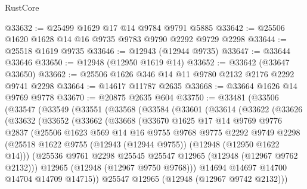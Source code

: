 \begin{lexlean}{RustCore}
\begin{coremodule}
@33632 := @25499 @1629 @17 @14 @9784 @9791 @5885
@33642 := @25506 @1620 @1628 @14 @16 @9735 @9783 @9790 @2292 @9729 @2298
@33644 := @25518 @1619 @9735
@33646 := @12943 (@12944 @9735)
@33647 := @33644 @33646
@33650 := @12948 (@12950 @1619 @14)
@33652 := @33642 (@33647 @33650)
@33662 := @25506 @1626 @346 @14 @11 @9780 @2132 @2176 @2292 @9741 @2298
@33664 := @14617 @11787 @2635
@33668 := @33664 @1626 @14 @9769 @9778
@33670 := @20875 @2635 @604
@33750 := @33481
    (@33506
      (@33547
        (@33549
          (@33551
            (@33568
              (@33584
                (@33601
                  (@33614
                    (@33622
                      (@33626
                        (@33632
                          (@33652
                            (@33662
                              (@33668
                                (@33670
                                  @1625
                                  @17
                                  @14
                                  @9769
                                  @9776
                                  @2837
                                  (@25506
                                    @1623
                                    @569
                                    @14
                                    @16
                                    @9755
                                    @9768
                                    @9775
                                    @2292
                                    @9749
                                    @2298
                                    (@25518
                                      @1622
                                      @9755
                                      (@12943 (@12944 @9755))
                                      (@12948 (@12950 @1622 @14)))
                                    (@25536
                                      @9761
                                      @2298
                                      @25545
                                      @25547
                                      @12965
                                      (@12948 (@12967 @9762 @2132)))
                                    @12965
                                    (@12948 (@12967 @9750 @9768)))
                                  @14694
                                  @14697
                                  @14700
                                  @14704
                                  @14709
                                  @14715))
                              @25547
                              @12965
                              (@12948 (@12967 @9742 @2132)))

\end{coremodule}
\end{lexlean}
